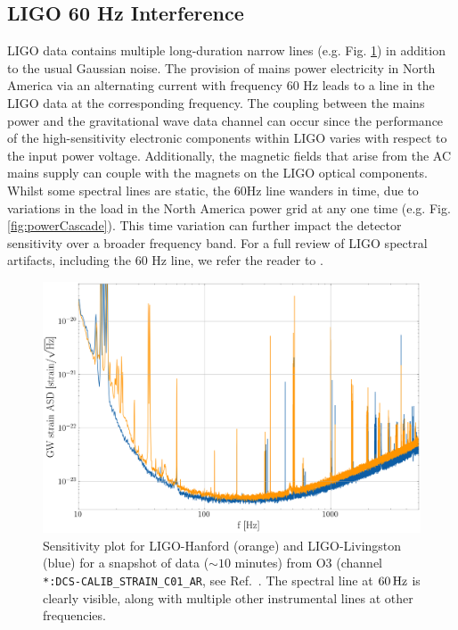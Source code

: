 \documentclass[pra,superscriptaddress,reprint,amsmath,amssymb,nofootinbib]{revtex4-2}
\begin{document}
\subsection{LIGO 60 Hz Interference}  \label{sec22}

LIGO data contains multiple long-duration narrow lines (e.g. Fig. \ref{fig:strainSensitivity}) in addition to the usual Gaussian noise. The provision of mains power electricity in North America via an alternating current with frequency 60 Hz leads to a line in the LIGO data at the corresponding frequency. The coupling between the mains power and the gravitational wave data channel can occur since the performance of the high-sensitivity electronic components within LIGO varies with respect to the input power voltage. Additionally, the magnetic fields that arise from the AC mains supply can couple with the magnets on the LIGO optical components. Whilst some spectral lines are static, the 60Hz line wanders in time, due to variations in the load in the North America power grid at any one time (e.g. Fig. \ref{fig:powerCascade}). This time variation can further impact the detector sensitivity over a broader frequency band. For a full review of LIGO spectral artifacts, including the 60 Hz line, we refer the reader to \cite{CovasEtAl:2018}.
\begin{figure}
	\begin{center}
		\includegraphics[width=\columnwidth]{images/sensitivity}
	\end{center}
	\caption{Sensitivity plot for LIGO-Hanford (orange) and LIGO-Livingston (blue) for a snapshot of data ($\sim 10$ minutes) from O3 (channel \texttt{*:DCS-CALIB\_STRAIN\_C01\_AR}, see Ref.~\cite{LIGO_O3, GWOSC:online}. The spectral line at $60\,{\rm Hz}$ is clearly visible, along with multiple other instrumental lines at other frequencies.}\label{fig:strainSensitivity}
\end{figure}
\end{document}
